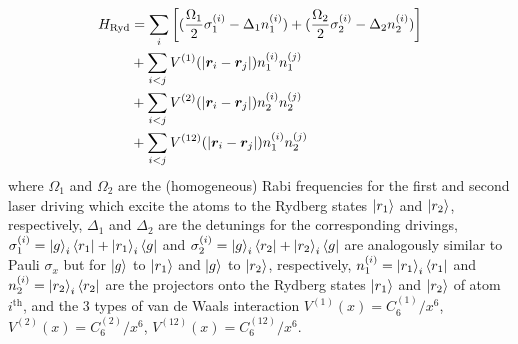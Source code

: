 \documentclass[%
 reprint,
nofootinbib,
 amsmath,amssymb,
 aps,
pra,
floatfix,
]{revtex4-2}
\begin{document}
\begin{align}\label{eq:H_ryd}
H_{\textit{\rm Ryd}} &= \sum_{i} \left[ (\frac{\Omega_1}{2}\sigma^{(i)}_1 - \Delta_1 n^{(i)}_1 ) + (\frac{\Omega_2} {2}\sigma^{(i)}_2 - \Delta_2 n^{(i)}_2 ) \right] \nonumber \\ 
&+ \sum_{i<j} V^{(1)}(|\boldsymbol{r}_i - \boldsymbol{r}_j|) n^{(i)}_1 n^{(j)}_1  \nonumber \\ 
&+ \sum_{i<j} V^{(2)}(|\boldsymbol{r}_i - \boldsymbol{r}_j|) n^{(i)}_2 n^{(j)}_2 \\
&+ \sum_{i<j} V^{(12)}(|\boldsymbol{r}_i - \boldsymbol{r}_j|) n^{(i)}_1 n^{(j)}_2 \nonumber
\end{align}
where $\Omega_1$ and $\Omega_2$ are the (homogeneous) Rabi frequencies for the first and second laser driving which excite the atoms to the Rydberg states $\ket{r_1}$ and $\ket{r_2}$, respectively, $\Delta_1$ and $\Delta_2$ are the detunings for the corresponding drivings, $\sigma^{(i)}_1 = \ket{g}_i\bra{r_1} + \ket{r_1}_i \bra{g}$ and $\sigma^{(i)}_2 = \ket{g}_i\bra{r_2} + \ket{r_2}_i \bra{g}$ are analogously similar to Pauli $\sigma_x$ but for $\ket{g}$ to $\ket{r_1}$ and $\ket{g}$ to $\ket{r_2}$, respectively,  $n^{(i)}_1 = \ket{r_1}_i \bra{r_1}$ and $n^{(i)}_2 = \ket{r_2}_i \bra{r_2}$ are the projectors onto the Rydberg states $\ket{r_1}$ and $\ket{r_2}$ of atom $i^{\text{th}}$, and the 3 types of van de Waals interaction $V^{(1)}(x) = C^{(1)}_6/x^6$, $V^{(2)}(x) = C^{(2)}_6/x^6$, $V^{(12)}(x) = C^{(12)}_6/x^6$. \\
\end{document}
